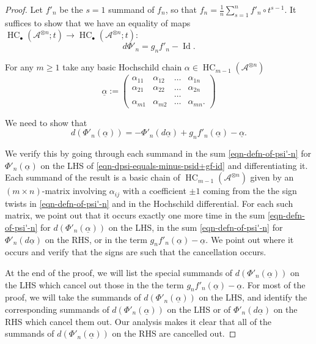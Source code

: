 \documentclass[10pt,a4paper]{amsart}
\def\A{{\mathcal{A}}}
\DeclareMathOperator{\hochcx}{{HC}}
\DeclareMathOperator{\id}{Id}
\begin{document}
\begin{proof}
Let $f'_n$ be the $s = 1$ summand of 
$f_n$, so that $f_n = \frac{1}{n} \sum_{s=1}^n f'_n \circ t^{s-1}$. 
It suffices to show that we have an equality of maps 
$\hochcx_\bullet(\A^{\otimes n}; t) 
\rightarrow \hochcx_\bullet(\A^{\otimes n}; t)$:
$$ d\Phi'_n = g_n f'_n - \id. $$

For any $m \geq 1$ take any basic Hochschild chain 
$\alpha \in \hochcx_{m-1}(\A^{\otimes n})$ 
\begin{equation*}
\underline{\alpha}
:= 
\begin{pmatrix}
\alpha_{11} & \alpha_{12} & \dots & \alpha_{1n}  
\\
\alpha_{21} & \alpha_{22} & \dots & \alpha_{2n}  
\\
& & \dots & 
\\
\alpha_{m1} & \alpha_{m2} & \dots & \alpha_{mn}. 
\end{pmatrix} 
\end{equation*}

We need to show that 
\begin{equation}
\label{eqn-dpsi-equals-minus-psid+gf-id}
d\left(\Phi'_n\left(\underline{\alpha}\right)\right) = 
- \Phi'_n\left(d\underline{\alpha}\right) + g_nf'_n(\underline{\alpha}) - 
\underline{\alpha}. 
\end{equation}

We verify this by going through each summand in 
the sum \eqref{eqn-defn-of-psi'-n} for $\Phi'_n(\underline{\alpha})$ on the LHS
of \eqref{eqn-dpsi-equals-minus-psid+gf-id}
and differentiating it. Each summand of the result 
is a basic chain of $\hochcx_{m-1}(\A^{\otimes n})$ given 
by an $(m \times n)$-matrix involving $\alpha_{ij}$ 
with a coefficient $\pm 1$ coming from the the sign twists in 
\eqref{eqn-defn-of-psi'-n} and in the Hochschild differential. 
For each such matrix, we point
out that it occurs exactly one more time in the
sum \eqref{eqn-defn-of-psi'-n} for $d(\Phi'_n(\underline{\alpha}))$ 
on the LHS, in the sum \eqref{eqn-defn-of-psi'-n} for $\Phi'_n(d
\underline{\alpha})$ on the RHS, 
or in the term $g_nf'_n(\underline{\alpha}) - \underline{\alpha}$. 
We point out where it occurs and verify that the signs are such 
that the cancellation occurs. 

At the end of the proof, we will list the special summands of 
$d(\Phi'_n(\underline{\alpha}))$ on the LHS which cancel out 
those in the the term  $g_nf'_n(\underline{\alpha}) -
\underline{\alpha}$. For most of the proof, we will take 
the summands of $d(\Phi'_n(\underline{\alpha}))$ on the LHS, and 
identify the corresponding summands of 
$d(\Phi'_n(\underline{\alpha}))$ on the LHS or of 
$\Phi'_n(d \underline{\alpha})$ on the RHS which cancel them out.  
Our analysis makes it clear that all of the summands 
of $d(\Phi'_n(\underline{\alpha}))$ on the RHS 
are cancelled out. 


\end{proof}
\end{document}
